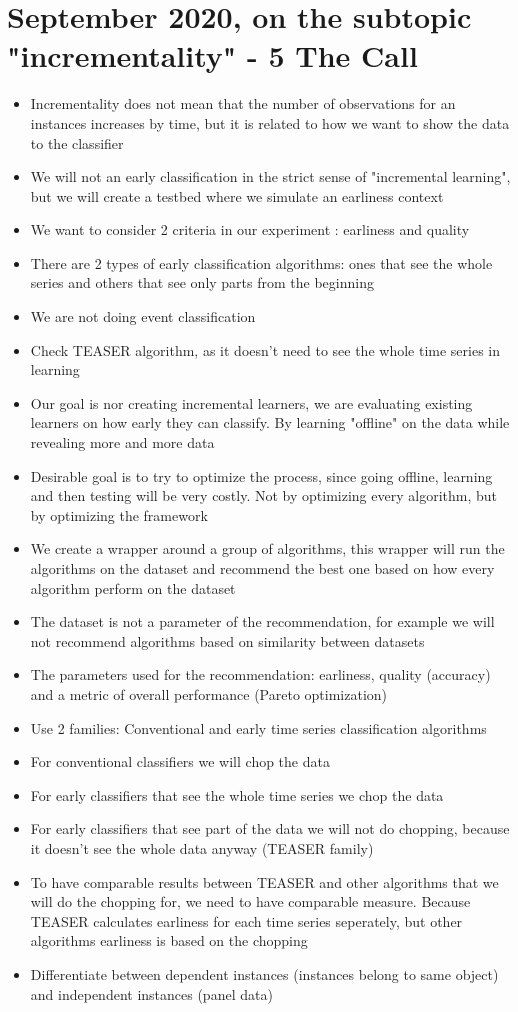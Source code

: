 \documentclass{article}
\begin{document}
\section*{\texorpdfstring{}. September 2020, on the subtopic "incrementality" - 5 The Call}
\begin{itemize}
	\item Incrementality does not mean that the number of observations for an instances increases by time, but it is related to how we want to show the data to the classifier
	\item We will not an early classification in the strict sense of "incremental learning", but we will create a testbed where we simulate an earliness context
	\item We want to consider 2 criteria in our experiment : earliness and quality
	\item There are 2 types of early classification algorithms: ones that see the whole series and others that see only parts from the beginning
	\item We are not doing event classification
	\item Check TEASER algorithm, as it doesn't need to see the whole time series in learning
	\item Our goal is nor creating incremental learners, we are evaluating existing learners on how early they can classify. By learning "offline" on the data while revealing more and more data
	\item Desirable goal is to try to optimize the process, since going offline, learning and then testing will be very costly. Not by optimizing every algorithm, but by optimizing the framework
	\item We create a wrapper around a group of algorithms, this wrapper will run the algorithms on the dataset and recommend the best one based on how every algorithm perform on the dataset
	\item The dataset is not a parameter of the recommendation, for example we will not recommend algorithms based on similarity between datasets
	\item The parameters used for the recommendation: earliness, quality (accuracy) and a metric of overall performance (Pareto optimization)
	\item Use 2 families: Conventional and early time series classification algorithms
	\item For conventional classifiers we will chop the data
	\item For early classifiers that see the whole time series we chop the data
	\item For early classifiers that see part of the data we will not do chopping, because it doesn't see the whole data anyway (TEASER family)
	\item To have comparable results between TEASER and other algorithms that we will do the chopping for, we need to have comparable measure. Because TEASER calculates earliness for each time series seperately, but other algorithms earliness is based on the chopping
	\item Differentiate between dependent instances (instances belong to same object) and independent instances (panel data)
\end{itemize}
\end{document}
